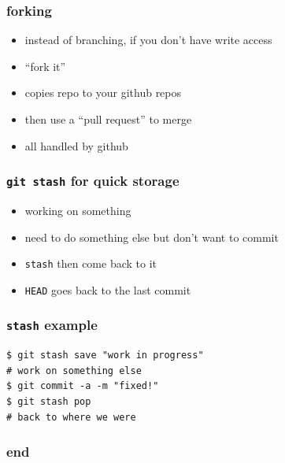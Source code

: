 \documentclass[ignorenonframetext,]{beamer}
\begin{document}
\begin{frame}\frametitle{forking}

\begin{itemize}[<+->]
\item
  instead of branching, if you don't have write access
\item
  ``fork it''
\item
  copies repo to your github repos
\item
  then use a ``pull request'' to merge
\item
  all handled by github
\end{itemize}

\end{frame}

\begin{frame}[fragile]\frametitle{\texttt{git stash} for quick storage}

\begin{itemize}[<+->]
\item
  working on something
\item
  need to do something else but don't want to commit
\item
  \texttt{stash} then come back to it
\item
  \texttt{HEAD} goes back to the last commit
\end{itemize}

\end{frame}

\begin{frame}[fragile]\frametitle{\texttt{stash} example}

\begin{verbatim}
$ git stash save "work in progress"
# work on something else
$ git commit -a -m "fixed!"
$ git stash pop
# back to where we were
\end{verbatim}

\end{frame}

\begin{frame}\frametitle{end}

\end{frame}
\end{document}
